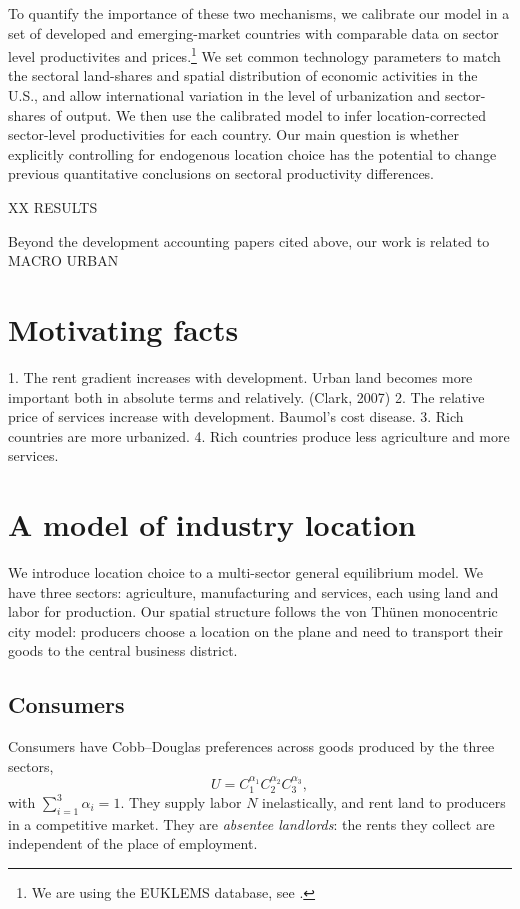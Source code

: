 \documentclass[12pt]{article}
\begin{document}
To quantify the importance of these two mechanisms, we calibrate our model in a set of developed and emerging-market countries with comparable data on sector level productivites and prices.\footnote{We are using the EUKLEMS database, see .} We set common technology parameters to match the sectoral land-shares and spatial distribution of economic activities in the U.S., and allow international variation in the level of urbanization and sector-shares of output. We then use the calibrated model to infer location-corrected sector-level productivities for each country. Our main question is whether explicitly controlling for endogenous location choice has the potential to change previous quantitative conclusions on sectoral productivity differences. %

XX RESULTS

\bigskip

Beyond the development accounting papers cited above, our work is related to MACRO URBAN


\section{Motivating facts}
1. The rent gradient increases with development. Urban land becomes more important both in absolute terms and relatively. (Clark, 2007)
2. The relative price of services increase with development. Baumol's cost disease.
3. Rich countries are more urbanized.
4. Rich countries produce less agriculture and more services.


\section{A model of industry location}
We introduce location choice to a multi-sector general equilibrium model. We have three sectors: agriculture, manufacturing and services, each using land and labor for production. Our spatial structure follows the von Thünen monocentric city model: producers choose a location on the plane and need to transport their goods to the central business district. %

\subsection{Consumers}
Consumers have Cobb--Douglas preferences across goods produced by the three sectors,
\begin{equation}
\label{eq:Utility}
U = C_1^{\alpha_1}C_2^{\alpha_2}C_3^{\alpha_3},
\end{equation}
with $\sum_{i=1}^3\alpha_i=1$. They supply labor $N$ inelastically, and rent land to producers in a competitive market. They are \emph{absentee landlords}: the rents they collect are independent of the place of employment.
\end{document}

